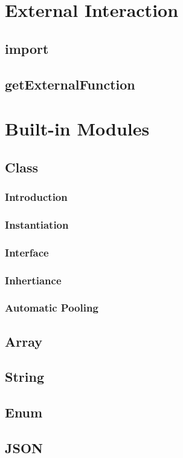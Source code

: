 \documentclass[12pt,letterpaper]{report}
\begin{document}
\chapter{External Interaction}
\section{import}
\section{getExternalFunction}
\chapter{Built-in Modules}
\section{Class}
\subsection{Introduction}
\subsection{Instantiation}
\subsection{Interface}
\subsection{Inhertiance}
\subsection{Automatic Pooling}
\section{Array}
\section{String}
\section{Enum}
\section{JSON}
\end{document}

